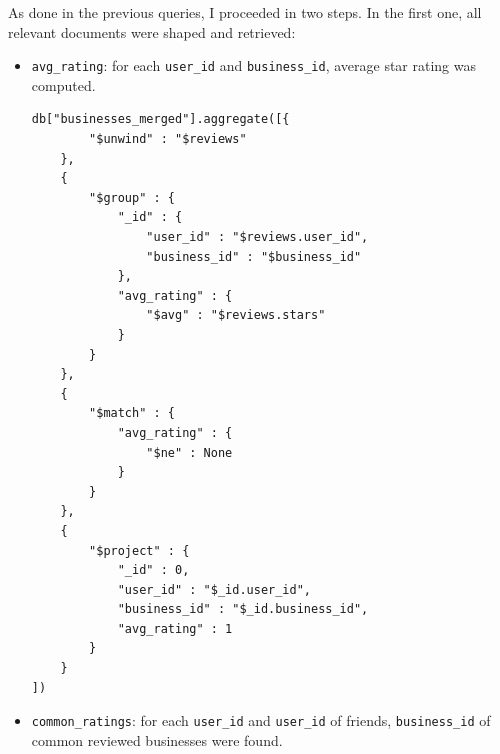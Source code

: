 \documentclass{Configuration_Files/PoliMi3i_thesis}
\begin{document}
As done in the previous queries, I proceeded in two steps. In the first one, all relevant documents were shaped and retrieved:
\begin{itemize}
    \item \texttt{avg\_rating}: for each \texttt{user\_id} and \texttt{business\_id}, average star rating was computed. 

\bigskip

\begin{lstlisting}[style = mongodb]
db["businesses_merged"].aggregate([{
        "$unwind" : "$reviews"
    },
    {
        "$group" : {
            "_id" : {
                "user_id" : "$reviews.user_id",
                "business_id" : "$business_id"
            },
            "avg_rating" : {
                "$avg" : "$reviews.stars"
            }
        }
    },
    {
        "$match" : {
            "avg_rating" : {
                "$ne" : None
            }
        }
    },
    {
        "$project" : {
            "_id" : 0,
            "user_id" : "$_id.user_id",
            "business_id" : "$_id.business_id",
            "avg_rating" : 1
        }
    }
])
\end{lstlisting}

\bigskip

\item \texttt{common\_ratings}: for each \texttt{user\_id} and \texttt{user\_id} of friends, \texttt{business\_id} of common reviewed businesses were found. 

\bigskip


\end{itemize}
\end{document}
